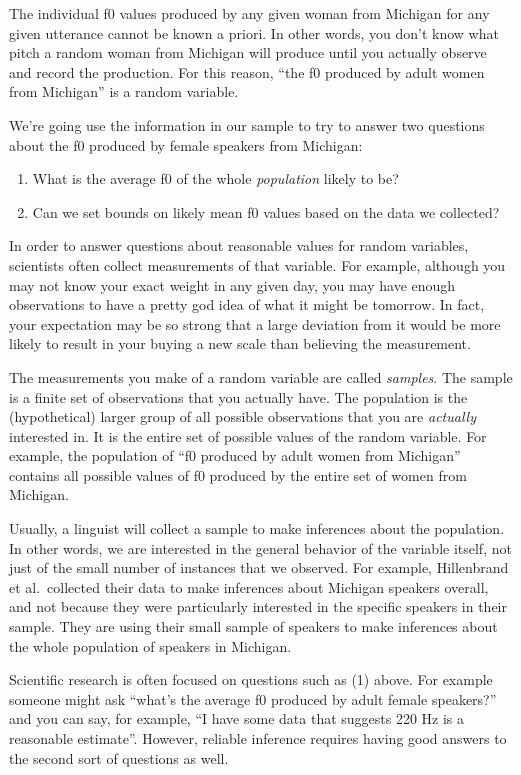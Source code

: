 \documentclass[
]{book}
\begin{document}
The individual f0 values produced by any given woman from Michigan for any given utterance cannot be known a priori. In other words, you don't know what pitch a random woman from Michigan will produce until you actually observe and record the production. For this reason, ``the f0 produced by adult women from Michigan'' is a random variable.

We're going use the information in our sample to try to answer two questions about the f0 produced by female speakers from Michigan:

\begin{enumerate}
\def\labelenumi{\arabic{enumi})}
\item
  What is the average f0 of the whole \emph{population} likely to be?
\item
  Can we set bounds on likely mean f0 values based on the data we collected?
\end{enumerate}

In order to answer questions about reasonable values for random variables, scientists often collect measurements of that variable. For example, although you may not know your exact weight in any given day, you may have enough observations to have a pretty god idea of what it might be tomorrow. In fact, your expectation may be so strong that a large deviation from it would be more likely to result in your buying a new scale than believing the measurement.

The measurements you make of a random variable are called \emph{samples}. The sample is a finite set of observations that you actually have. The population is the (hypothetical) larger group of all possible observations that you are \emph{actually} interested in. It is the entire set of possible values of the random variable. For example, the population of ``f0 produced by adult women from Michigan'' contains all possible values of f0 produced by the entire set of women from Michigan.

Usually, a linguist will collect a sample to make inferences about the population. In other words, we are interested in the general behavior of the variable itself, not just of the small number of instances that we observed. For example, Hillenbrand et al.~collected their data to make inferences about Michigan speakers overall, and not because they were particularly interested in the specific speakers in their sample. They are using their small sample of speakers to make inferences about the whole population of speakers in Michigan.

Scientific research is often focused on questions such as (1) above. For example someone might ask ``what's the average f0 produced by adult female speakers?'' and you can say, for example, ``I have some data that suggests 220 Hz is a reasonable estimate''. However, reliable inference requires having good answers to the second sort of questions as well.
\end{document}
